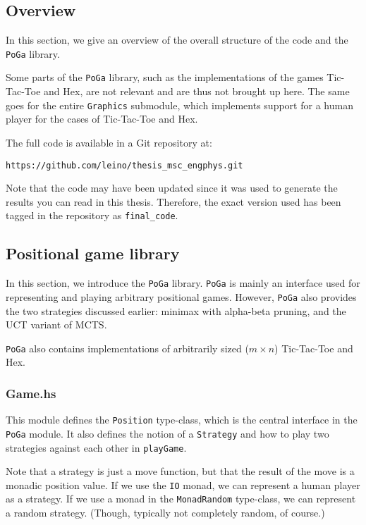 \subsection {Overview}

In this section, we give an overview of the overall structure of the code and the \texttt{PoGa} library.


Some parts of the \texttt{PoGa} library, such as the implementations of the games Tic-Tac-Toe and Hex, are not relevant and are thus not brought up here.
The same goes for the entire \texttt{Graphics} submodule, which implements support for a human player for the cases of Tic-Tac-Toe and Hex.

The full code is available in a Git repository at:

\texttt{https://github.com/leino/thesis\_msc\_engphys.git}

Note that the code may have been updated since it was used to generate the results you can read in this thesis. Therefore, the exact version used has been tagged in the repository as \texttt{final\_code}.

\subsection {Positional game library}

In this section, we introduce the \texttt{PoGa} library.
\texttt{PoGa} is mainly an interface used for representing and playing arbitrary positional games.
However, \texttt{PoGa} also provides the two strategies discussed earlier: minimax with alpha-beta pruning, and the UCT variant of MCTS.

\texttt{PoGa} also contains implementations of arbitrarily sized ($m \times n$) Tic-Tac-Toe and Hex.

\subsubsection {Game.hs}

This module defines the \texttt{Position} type-class, which is the central interface in the \texttt{PoGa} module.
It also defines the notion of a \texttt{Strategy} and how to play two strategies against each other in \texttt{playGame}.

Note that a strategy is just a move function, but that the result of the move is a monadic position value.
If we use the \texttt{IO} monad, we can represent a human player as a strategy. If we use a monad in the \texttt{MonadRandom} type-class, we can represent a random strategy. (Though, typically not completely random, of course.)


